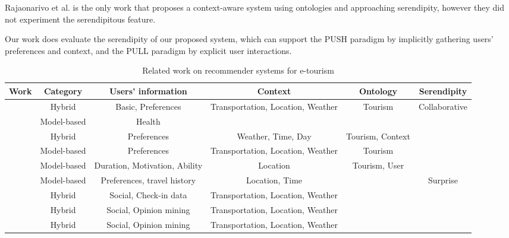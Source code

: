 Rajaonarivo et al. \cite{rajaonarivo2019rec} is the only work that proposes a context-aware system using ontologies and approaching serendipity, however they did not experiment the serendipitous feature.

Our work does evaluate the serendipity of our proposed system, which can support the PUSH paradigm by implicitly gathering users' preferences and context, and the PULL paradigm by explicit user interactions.


\begin{table*}[h!]
    \centering
    \caption{Related work on recommender systems for e-tourism}
    \label{table:related-work}
    \begin{tabular}{|c|c|c|c|c|c|} 
        \hline
        \textbf{Work} & \textbf{Category} & \textbf{Users' information} & \textbf{Context}&\textbf{Ontology}&\textbf{Serendipity} \\
        \hline \hline 

        \cite{rajaonarivo2019rec} & Hybrid & Basic, Preferences & Transportation, Location, Weather & Tourism & Collaborative \\ \hline

        \cite{santos2019using} & Model-based & Health & & & \\ \hline

        \cite{bahramian_abbaspour_claramunt_2017} & Hybrid & Preferences & Weather, Time, Day & Tourism, Context & \\ \hline

        \cite{arigi2018context} & Model-based & Preferences & Transportation, Location, Weather & Tourism & \\ \hline

        \cite{ruotsalo2013smartmuseum} & Model-based & Duration, Motivation, Ability & Location & Tourism, User & \\ \hline

        \cite{shen2016attraction} & Model-based & Preferences, travel history & Location, Time & & Surprise \\ \hline

        \cite{kesorn2017personalized} & Hybrid & Social, Check-in data & Transportation, Location, Weather & & \\ \hline

        \cite{logesh2019exploring} & Hybrid & Social, Opinion mining & Transportation, Location, Weather &  & \\ \hline

        \cite{logesh2018personalised} & Hybrid & Social, Opinion mining & Transportation, Location, Weather &  & \\ \hline


\end{tabular}
\end{table*}

